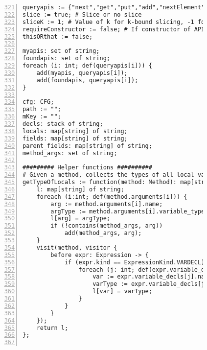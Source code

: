 \begin{figure}[ht!]
\begin{lstlisting}[numbers=left, tabsize=4, escapechar=@, caption={API Usage Mining Analysis},label={lst:aun-code},  firstline = 321, firstnumber = 321, lastline = 381]
queryapis := {"next","get","put","add","nextElement","elementAt","size","remove","nextToken","toArray","getString","group","getProperty","iterator","addElement","info","compile","containsKey","matcher","setProperty","contains","fine","set","keySet","addAll","nextInt","log","entrySet","pop","warning","asList","getTime","push","indexOf","subList","fill","values","clear","getTimeZone","hasNext","getBundle","sort","finest","getLogger","end","start","store","removeElementAt","setTime","removeFirst","severe","finer","copyInto","getKey","peek","insertElementAt","hasMoreTokens","getValue","getName","previous","compare","getBoolean","isEmpty","copyOf","load","elements","getInputStream","getInt","schedule","removeElement","firstElement","appendReplacement","userNodeForPackage","setElementAt","putAll","unmodifiableList","replaceAll","write","split","nextLine","hasMoreElements","after","noneOf","removeLast","before","removeAll","listIterator","addLast","cancel","groupCount","putInt","equals","addFirst","toString","singleton","singletonList","node","getFirst","matches","keys","putBoolean","getLast","copyOfRange","binarySearch","compareTo","isDirectory","scheduleAtFixedRate","nextSetBit","hashCode","setTimeInMillis","config","allOf","getLanguage","poll","find","entering","first","setSize","lastElement","replaceFirst","compareAndSet","putIfAbsent"}; # API methods
slice := true; # Slice or no slice
sliceK := 1; # Value of k for k-bound slicing, -1 for infinity
requireConstructor := false; # If constructor of API class are of interest
thisORthat := false;

myapis: set of string;
foundapis: set of string;
foreach (i: int; def(queryapis[i])) {
    add(myapis, queryapis[i]);   
    add(foundapis, queryapis[i]);
}

cfg: CFG;
path := "";
mKey := "";
decls: stack of string;
locals: map[string] of string;
fields: map[string] of string;
parent_fields: map[string] of string;
method_args: set of string;

######### Helper functions ##########
# Given a method, collects the types of all local variables including method parameters
getTypeOfLocals := function(method: Method): map[string] of string {
    l: map[string] of string;
    foreach (i:int; def(method.arguments[i])) {
        arg := method.arguments[i].name;
        argType := method.arguments[i].variable_type.name;
        l[arg] = argType;
        if (!contains(method_args, arg))
            add(method_args, arg);
    }
    visit(method, visitor {
        before expr: Expression -> {            
            if (expr.kind == ExpressionKind.VARDECL) {
                foreach (j: int; def(expr.variable_decls[j])) {
                    var := expr.variable_decls[j].name;
                    varType := expr.variable_decls[j].variable_type.name;
                    l[var] = varType;
                }
            }
        }
    });
    return l;
};


\end{lstlisting}
\end{figure}
